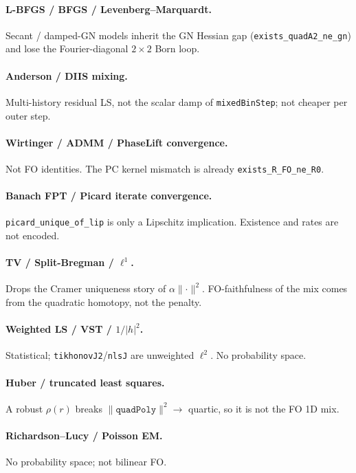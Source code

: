 \documentclass[11pt,a4paper]{article}
\theoremstyle{definition}
\theoremstyle{remark}
\newcommand{\abs}[1]{\lvert#1\rvert}
\newcommand{\norm}[1]{\lVert#1\rVert}
\begin{document}
\paragraph{L-BFGS / BFGS / Levenberg--Marquardt.}
Secant / damped-GN models inherit the GN Hessian gap
(\texttt{exists\_quadA2\_ne\_gn}) and lose the Fourier-diagonal
$2\times 2$ Born loop.

\paragraph{Anderson / DIIS mixing.}
Multi-history residual LS, not the scalar damp of
\texttt{mixedBinStep}; not cheaper per outer step.

\paragraph{Wirtinger / ADMM / PhaseLift convergence.}
Not FO identities.
The PC kernel mismatch is already \texttt{exists\_R\_FO\_ne\_R0}.

\paragraph{Banach FPT / Picard iterate convergence.}
\texttt{picard\_unique\_of\_lip} is only a Lipschitz implication.
Existence and rates are not encoded.

\paragraph{TV / Split-Bregman / $\ell^1$.}
Drops the Cramer uniqueness story of $\alpha\norm{\cdot}^2$.
FO-faithfulness of the mix comes from the quadratic homotopy, not the
penalty.

\paragraph{Weighted LS / VST / $1/\abs{h}^2$.}
Statistical; \texttt{tikhonovJ2}/\texttt{nlsJ} are unweighted
$\ell^2$. No probability space.

\paragraph{Huber / truncated least squares.}
A robust $\rho(r)$ breaks $\norm{\texttt{quadPoly}}^2\to$ quartic, so
it is not the FO 1D mix.

\paragraph{Richardson--Lucy / Poisson EM.}
No probability space; not bilinear FO.
\end{document}
